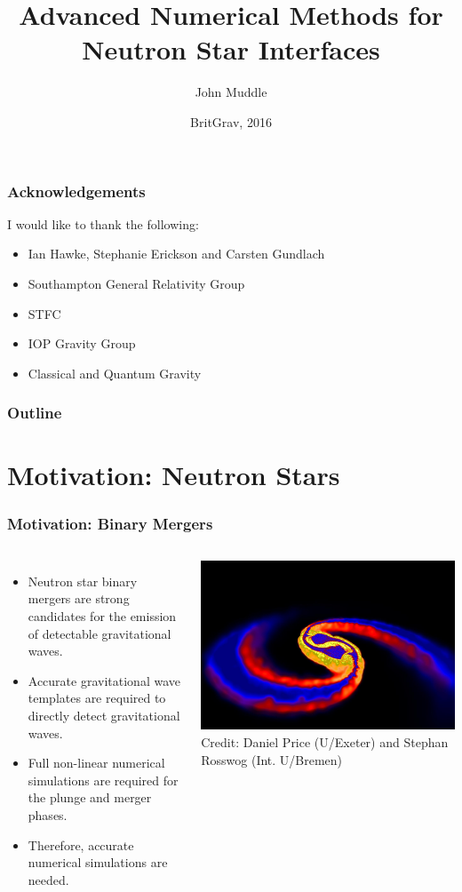 \documentclass{beamer}
\title[Advanced Numerical Methods for Neutron Star Interfaces] %
{Advanced Numerical Methods for \\
Neutron Star Interfaces}
\subtitle{}
\author[John Muddle - @john$\_$muddle] %
{John Muddle}
\institute[University of Southampton] %
{
  School of Mathematics\\
  University of Southampton\\[1\baselineskip]
  Supervisor - Dr Ian Hawke

}
\date[Britgrav 2016] %
{BritGrav, 2016}
\begin{document}
\begin{frame}
  \titlepage
\end{frame}
\begin{frame}
\frametitle{Acknowledgements}
I would like to thank the following:
\begin{itemize}
\item{Ian Hawke, Stephanie Erickson and Carsten Gundlach}
\item{Southampton General Relativity Group}
\item{STFC}
\item{IOP Gravity Group}
\item{Classical and Quantum Gravity}
\end{itemize}
\end{frame}
 \begin{frame}
   \frametitle{Outline}
   \tableofcontents
 \end{frame}
\section{Motivation: Neutron Stars}

\begin{frame}
\frametitle{Motivation: Binary Mergers}
\begin{columns}
\begin{itemize}
\item{Neutron star binary mergers are strong candidates for the emission of detectable gravitational waves.}
\item{Accurate gravitational wave templates are required to directly detect gravitational waves.}
\item{Full non-linear numerical simulations are required for the plunge and merger phases.}
\item{Therefore, accurate numerical simulations are needed.}
\end{itemize}
\includegraphics[width=\textwidth]{../images/price_rosswog_press_1}\\
\tiny Credit: Daniel Price (U/Exeter) and Stephan Rosswog (Int. U/Bremen)
\end{columns}
\end{frame}
\end{document}
